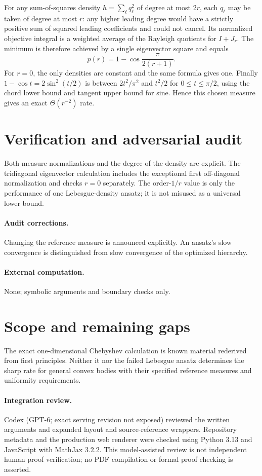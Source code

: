 \documentclass[11pt]{article}
\begin{document}
For any sum-of-squares density $h=\sum_\ell q_\ell^2$ of degree at most $2r$, each $q_\ell$ may be taken of degree at most $r$: any higher leading degree would have a strictly positive sum of squared leading coefficients and could not cancel. Its normalized objective integral is a weighted average of the Rayleigh quotients for $I+J_r$. The minimum is therefore achieved by a single eigenvector square and equals
\[
p(r)=1-\cos\frac{\pi}{2(r+1)}.
\]
For $r=0$, the only densities are constant and the same formula gives one. Finally $1-\cos t=2\sin^2(t/2)$ is between $2t^2/\pi^2$ and $t^2/2$ for $0\le t\le\pi/2$, using the chord lower bound and tangent upper bound for sine. Hence this chosen measure gives an exact $\Theta(r^{-2})$ rate.
\section{Verification and adversarial audit}
Both measure normalizations and the degree of the density are explicit. The tridiagonal eigenvector calculation includes the exceptional first off-diagonal normalization and checks $r=0$ separately. The order-$1/r$ value is only the performance of one Lebesgue-density ansatz; it is not misused as a universal lower bound.
\paragraph{Audit corrections.} Changing the reference measure is announced explicitly. An ansatz's slow convergence is distinguished from slow convergence of the optimized hierarchy.
\paragraph{External computation.} None; symbolic arguments and boundary checks only.
\section{Scope and remaining gaps}
The exact one-dimensional Chebyshev calculation is known material rederived from first principles. Neither it nor the failed Lebesgue ansatz determines the sharp rate for general convex bodies with their specified reference measures and uniformity requirements.
\paragraph{Integration review.} Codex (GPT-6; exact serving revision not exposed) reviewed the written arguments and expanded layout and source-reference wrappers. Repository metadata and the production web renderer were checked using Python 3.13 and JavaScript with MathJax 3.2.2. This model-assisted review is not independent human proof verification; no PDF compilation or formal proof checking is asserted.
\end{document}
